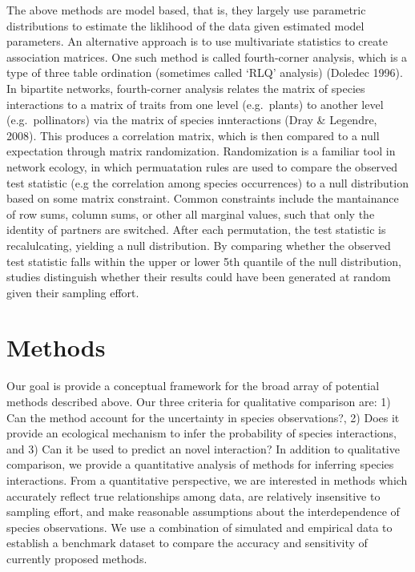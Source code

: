 The above methods are model based, that is, they largely use parametric
distributions to estimate the liklihood of the data given estimated model
parameters. An alternative approach is to use multivariate statistics to create
association matrices. One such method is called fourth-corner analysis, which is
a type of three table ordination (sometimes called `RLQ' analysis) (Doledec
1996). In bipartite networks, fourth-corner analysis relates the matrix of
species interactions to a matrix of traits from one level (e.g.~plants) to
another level (e.g.~pollinators) via the matrix of species innteractions (Dray \&
Legendre, 2008). This produces a correlation matrix, which is then compared to a
null expectation through matrix randomization. Randomization is a familiar tool
in network ecology, in which permuatation rules are used to compare the observed
test statistic (e.g the correlation among species occurrences) to a null
distribution based on some matrix constraint. Common constraints include the
mantainance of row sums, column sums, or other all marginal values, such that
only the identity of partners are switched. After each permutation, the test
statistic is recalulcating, yielding a null distribution. By comparing whether
the observed test statistic falls within the upper or lower 5th quantile of the
null distribution, studies distinguish whether their results could have been
generated at random given their sampling effort.

\section{Methods}\label{methods}

Our goal is provide a conceptual framework for the broad array of potential
methods described above. Our three criteria for qualitative comparison are: 1)
Can the method account for the uncertainty in species observations?, 2) Does it
provide an ecological mechanism to infer the probability of species
interactions, and 3) Can it be used to predict an novel interaction? In addition
to qualitative comparison, we provide a quantitative analysis of methods for
inferring species interactions. From a quantitative perspective, we are
interested in methods which accurately reflect true relationships among data,
are relatively insensitive to sampling effort, and make reasonable assumptions
about the interdependence of species observations. We use a combination of
simulated and empirical data to establish a benchmark dataset to compare the
accuracy and sensitivity of currently proposed methods.

